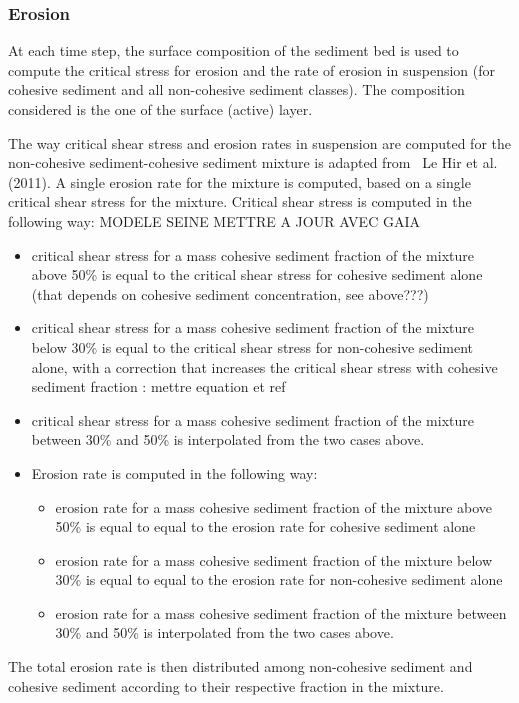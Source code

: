 \subsubsection{Erosion}
At each time step, the surface composition of the sediment bed is used to compute the critical stress for erosion and the rate of erosion in suspension (for cohesive sediment and all non-cohesive sediment classes). The composition considered is the one of the surface (active) layer.

The way critical shear stress and erosion rates in suspension are computed for the non-cohesive sediment-cohesive sediment mixture is adapted from~\cite{} Le Hir et al. (2011). A single erosion rate for the mixture is computed, based on a single critical shear stress for the mixture. Critical shear stress is computed in the following way:  MODELE SEINE METTRE A JOUR AVEC GAIA
\begin{itemize}
\item critical shear stress for a mass cohesive sediment fraction of the mixture above 50\% is equal to the critical shear stress for cohesive sediment alone (that depends on cohesive sediment concentration, see above???)
\item critical shear stress for a mass cohesive sediment fraction of the mixture below 30\% is equal to the critical shear stress for non-cohesive sediment alone, with a correction that increases the critical shear stress with cohesive sediment fraction : mettre equation et ref
\item critical shear stress for a mass cohesive sediment fraction of the mixture between 30\% and 50\% is interpolated from the two cases above.
\item Erosion rate is computed in the following way:
  \begin{itemize}
   \item erosion rate for a mass cohesive sediment fraction of the mixture above 50\% is equal to equal to the erosion rate for cohesive sediment alone
   \item erosion rate for a mass cohesive sediment fraction of the mixture below 30\% is equal to equal to the erosion rate for non-cohesive sediment alone
   \item erosion rate for a mass cohesive sediment fraction of the mixture between 30\% and 50\% is interpolated from the two cases above.
  \end{itemize}
\end{itemize}
          
The total erosion rate is then distributed among non-cohesive sediment and cohesive sediment according to their respective fraction in the mixture.

